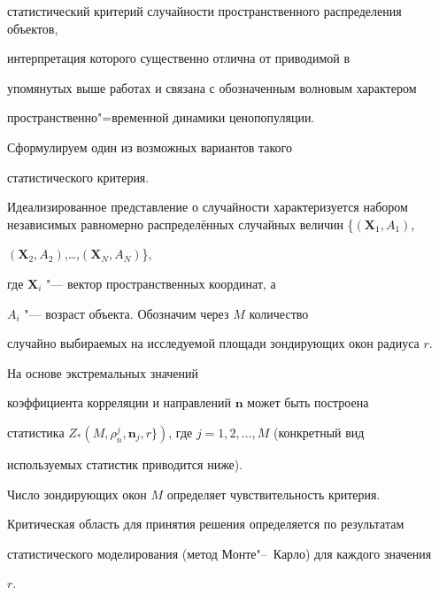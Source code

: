 статистический критерий случайности пространственного распределения объектов,

интерпретация которого существенно отлична от приводимой в 

упомянутых выше работах и связана с обозначенным волновым характером

пространственно"=временной динамики ценопопуляции. 

Сформулируем один из возможных вариантов такого 

статистического критерия. 



Идеализированное представление о случайности характеризуется набором независимых равномерно распределённых случайных величин \{$(\mathbf{X}_1,A_1)$,

$(\mathbf{X}_2,A_2)$,\ldots,$(\mathbf{X}_N,A_N)$\}, 

где $\mathbf{X}_i$ "--- вектор пространственных координат, а

$A_i$ "--- возраст объекта. Обозначим через $M$ количество

случайно выбираемых на исследуемой площади зондирующих окон радиуса $r$. 

На основе  экстремальных значений

коэффициента корреляции и направлений $\mathbf{n}$ может быть построена

статистика $Z_{\ast}(M,\rho_n^j, \mathbf{n}_j, r\})$, где  $j=1, 2, \ldots, M$ (конкретный вид

используемых статистик приводится ниже). 

Число зондирующих окон $M$ определяет чувствительность критерия. 

Критическая область для принятия решения определяется по результатам

статистического моделирования (метод Монте"--~Карло) для каждого значения

$r$. 









